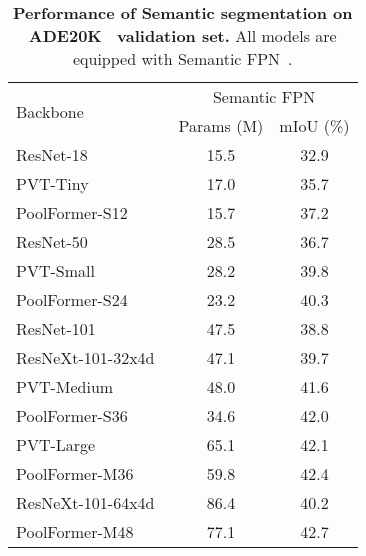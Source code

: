 \begin{table}[t]
\small
\centering
\setlength{\tabcolsep}{3.5pt}
\begin{tabular}{l|c|c}
\toprule
\multirow{2}{*}{Backbone} & \multicolumn{2}{c}{Semantic FPN}\\
\cline{2-3}
& Params (M) & mIoU (\%) \\
    \whline
	\resnetdot{} ResNet-18~\cite{resnet}                & 15.5 &  32.9 \\
	\pvtdot{} PVT-Tiny~\cite{pvt}           & 17.0 &  35.7 \\
	\poolformer{} PoolFormer-S12                    & 15.7 &  37.2 \\
	\hline
    \resnetdot{} ResNet-50~\cite{resnet}                & 28.5 &  36.7 \\
    \pvtdot{} PVT-Small~\cite{pvt}          & 28.2 &  39.8 \\
	\poolformer{} PoolFormer-S24                    & 23.2 &  40.3 \\
    \hline
    \resnetdot{} ResNet-101~\cite{resnet}               & 47.5 &  38.8\\
    \resnetdot{} ResNeXt-101-32x4d~\cite{xie2017aggregated} & 47.1 &  39.7 \\
    \pvtdot{} PVT-Medium~\cite{pvt}         & 48.0 & 41.6 \\
    \poolformer{} PoolFormer-S36                    & 34.6 & 42.0 \\
    \hline
    \pvtdot{} PVT-Large~\cite{pvt}          & 65.1 &  42.1 \\
    \poolformer{} PoolFormer-M36                    & 59.8 & 42.4 \\
    \hline
    \resnetdot{} ResNeXt-101-64x4d~\cite{xie2017aggregated} & 86.4 &  40.2 \\
    \poolformer{} PoolFormer-M48                   & 77.1 &  42.7 \\
\bottomrule
\end{tabular} \vspace{-3mm}
\caption{\textbf{Performance of Semantic segmentation on ADE20K~\cite{ade20k} validation set.} All models are equipped with Semantic FPN~\cite{fpn}.}
\label{tab:ade20k}
\normalsize
\vspace{-5mm}
\end{table}


